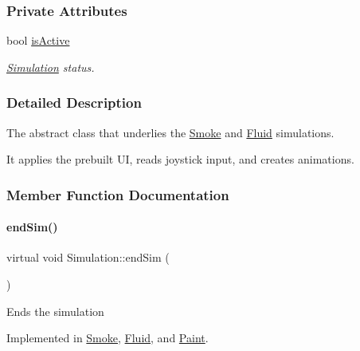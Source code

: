 \subsubsection*{Private Attributes}
\begin{DoxyCompactItemize}
\item 
bool \mbox{\hyperlink{classSimulation_ad76dc6e6d56b95b074f3824340f91a4c}{is\+Active}}
\begin{DoxyCompactList}\small\item\em \mbox{\hyperlink{classSimulation}{Simulation}} status. \end{DoxyCompactList}\end{DoxyCompactItemize}


\subsubsection{Detailed Description}
The abstract class that underlies the \mbox{\hyperlink{classSmoke}{Smoke}} and \mbox{\hyperlink{classFluid}{Fluid}} simulations. 

It applies the prebuilt UI, reads joystick input, and creates animations. 

\subsubsection{Member Function Documentation}
\mbox{\label{classSimulation_ab496d124202f55e741db7db9a304a7ee}} 
\paragraph{\texorpdfstring{endSim()}{endSim()}}
{\footnotesize\ttfamily virtual void Simulation\+::end\+Sim (\begin{DoxyParamCaption}{ }\end{DoxyParamCaption})\hspace{0.3cm}{\ttfamily [pure virtual]}}

Ends the simulation 

Implemented in \mbox{\hyperlink{classSmoke_a83d3a0d8bf172fcd6bc42ebf07f0f12f}{Smoke}}, \mbox{\hyperlink{classFluid_a92695db4868e8b2ec1bf4649ce5a9d19}{Fluid}}, and \mbox{\hyperlink{classPaint_a0624eaeb1d076ab01278b27026aba249}{Paint}}.

\mbox{\label{classSimulation_a04cafb2071be521281c2584fa300b912}} 
